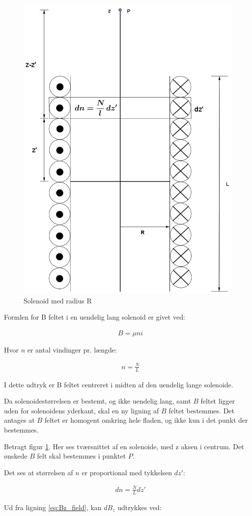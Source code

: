 \begin{figure}[h!]
	\centering
	\includegraphics[width=.5\textwidth]{billeder/B_felt2.png}
	\caption{Solenoid med radius R}
	\label{fig:spole_fig2}
\end{figure}

Formlen for B feltet i en uendelig lang solenoid er givet ved:

\begin{align}
	&B=\mu ni
\end{align}

Hvor $n$ er antal vindinger pr. længde:


\begin{align}
	&n=\frac{N}{L}
\end{align}

I dette udtryk er B feltet centreret i midten af den uendelig lange solenoide.

Da solenoidestørrelsen er bestemt, og ikke uendelig lang, samt $B$ feltet ligger uden for solenoidens yderkant, skal en ny ligning af $B$ feltet bestemmes.
Det antages at $B$ feltet er homogent omkring hele fladen, og ikke kun i det punkt der bestemmes.


Betragt figur \ref{fig:spole_fig2}. Her ses tværsnittet af en solenoide, med z aksen i centrum. Det ønskede $B$ felt skal bestemmes i punktet $P$.

Det ses at størrelsen af $n$ er proportional med tykkelsen $dz'$:

\begin{align}
	&dn=\frac{N}{L} dz'
\end{align}



Ud fra ligning \ref{eq:Bz_field}, kan $dB_z$ udtrykkes ved: 

